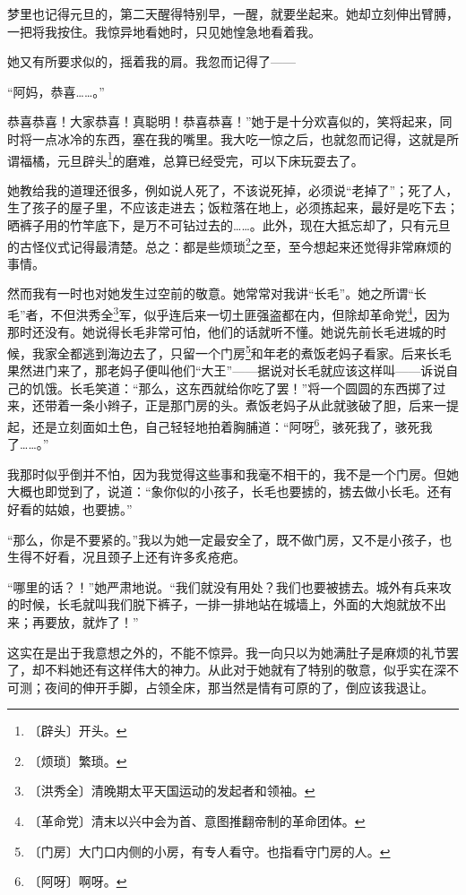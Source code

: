 \documentclass[12pt,UTF-8,openany]{ctexbook}
\begin{document}
\begin{normalsize}
    梦里也记得元旦的，第二天醒得特别早，一醒，就要坐起来。她却立刻伸出臂膊，一把将我按住。我惊异地看她时，只见她惶急地看着我。
    
    她又有所要求似的，摇着我的肩。我忽而记得了——
    
    “阿妈，恭喜……。”
    
    恭喜恭喜！大家恭喜！真聪明！恭喜恭喜！”她于是十分欢喜似的，笑将起来，同时将一点冰冷的东西，塞在我的嘴里。我大吃一惊之后，也就忽而记得，这就是所谓福橘，元旦辟头\footnote{〔辟头〕开头。}的磨难，总算已经受完，可以下床玩耍去了。
    
    她教给我的道理还很多，例如说人死了，不该说死掉，必须说“老掉了”；死了人，生了孩子的屋子里，不应该走进去；饭粒落在地上，必须拣起来，最好是吃下去；晒裤子用的竹竿底下，是万不可钻过去的……。此外，现在大抵忘却了，只有元旦的古怪仪式记得最清楚。总之：都是些烦琐\footnote{〔烦琐〕繁琐。}之至，至今想起来还觉得非常麻烦的事情。
    
    然而我有一时也对她发生过空前的敬意。她常常对我讲“长毛”。她之所谓“长毛”者，不但洪秀全\footnote{〔洪秀全〕清晚期太平天国运动的发起者和领袖。}军，似乎连后来一切土匪强盗都在内，但除却革命党\footnote{〔革命党〕清末以兴中会为首、意图推翻帝制的革命团体。}，因为那时还没有。她说得长毛非常可怕，他们的话就听不懂。她说先前长毛进城的时候，我家全都逃到海边去了，只留一个门房\footnote{〔门房〕大门口内侧的小房，有专人看守。也指看守门房的人。}和年老的煮饭老妈子看家。后来长毛果然进门来了，那老妈子便叫他们“大王”——据说对长毛就应该这样叫——诉说自己的饥饿。长毛笑道：“那么，这东西就给你吃了罢！”将一个圆圆的东西掷了过来，还带着一条小辫子，正是那门房的头。煮饭老妈子从此就骇破了胆，后来一提起，还是立刻面如土色，自己轻轻地拍着胸脯道：“阿呀\footnote{〔阿呀〕啊呀。}，骇死我了，骇死我了……。”
    
    我那时似乎倒并不怕，因为我觉得这些事和我毫不相干的，我不是一个门房。但她大概也即觉到了，说道：“象你似的小孩子，长毛也要掳的，掳去做小长毛。还有好看的姑娘，也要掳。”
    
    “那么，你是不要紧的。”我以为她一定最安全了，既不做门房，又不是小孩子，也生得不好看，况且颈子上还有许多炙疮疤。
    
    “哪里的话？！”她严肃地说。“我们就没有用处？我们也要被掳去。城外有兵来攻的时候，长毛就叫我们脱下裤子，一排一排地站在城墙上，外面的大炮就放不出来；再要放，就炸了！”
    
    这实在是出于我意想之外的，不能不惊异。我一向只以为她满肚子是麻烦的礼节罢了，却不料她还有这样伟大的神力。从此对于她就有了特别的敬意，似乎实在深不可测；夜间的伸开手脚，占领全床，那当然是情有可原的了，倒应该我退让。
    

\end{normalsize}
\end{document}
